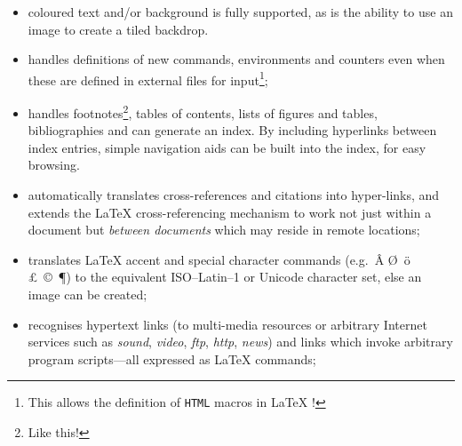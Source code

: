 \begin{itemize}
%
%
%
\item 
coloured text and/or background is fully supported, as is the
ability to use an image to create a tiled backdrop.

%
%
%
\item 
handles definitions of new commands, environments and counters
even when these are defined in external files for input\footnote{%
This allows the definition of \texttt{HTML} macros in \LaTeX{} !};

%
%
\item 
handles footnotes\footnote{Like this!}, 
tables of contents, lists of figures and tables, 
bibliographies and can generate an index.
By including hyperlinks between index entries, 
simple navigation aids can be built into the index, for easy browsing.

%
%
\item 
automatically translates cross-references and citations into hyper-links,
and extends the \LaTeX{}  cross-referencing mechanism to work
not just within a document but \emph{between documents} 
which may reside in remote locations;

%
%
%
%
\item 
translates \LaTeX{}  accent and special character 
commands (e.g.\ \^{A} \O\ {\"o} \pounds\ \copyright\ \P) to
the equivalent ISO--Latin--1 or Unicode character set,
else an image can be created;

%
%
%
\item 
recognises hypertext links (to multi-media resources or
arbitrary Internet services such as 
\textsl{sound}, \textsl{video}, \textsl{ftp}, \textsl{http}, \textsl{news}) and
links which invoke arbitrary program scripts---all expressed as \LaTeX{}  
commands;


\end{itemize}
